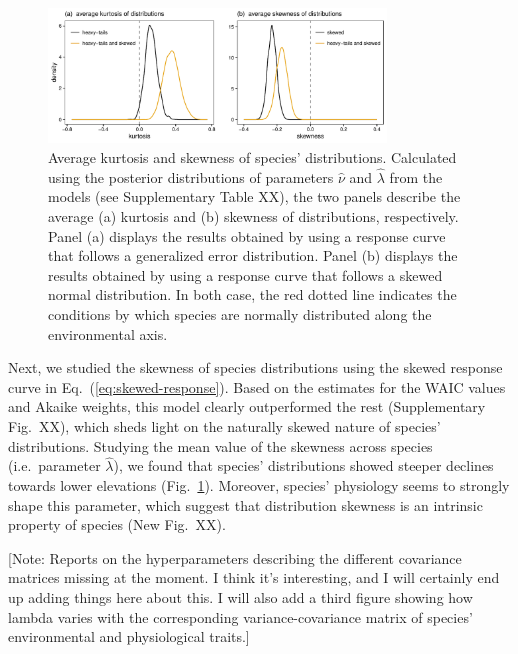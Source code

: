 \documentclass[11pt, a4paper]{article}
\begin{document}
\begin{figure}[ht]
  \centering
    \vspace{0.5cm}
    \includegraphics[width=0.8\textwidth]{figures/kurto-skew}
    	  \vspace{0.3cm}
	   \caption{Average kurtosis and skewness of species' distributions. Calculated using the posterior distributions of parameters $\hat{\nu}$ and $\hat{\lambda}$ from the models (see Supplementary Table XX), the two panels describe the average (a) kurtosis and (b) skewness of distributions, respectively. Panel (a) displays the results obtained by using a response curve that follows a generalized error distribution. Panel (b) displays the results obtained by using a response curve that follows a skewed normal distribution. In both case, the red dotted line indicates the conditions by which species are normally distributed along the environmental axis.}
      \label{fig:kurtosis-skewness}
\end{figure}

Next, we studied the skewness of species distributions using the skewed response curve in Eq.~(\ref{eq:skewed-response}). Based on the estimates for the WAIC values and Akaike weights, this model clearly outperformed the rest (Supplementary Fig.~XX), which sheds light on the naturally skewed nature of species' distributions. Studying the mean value of the skewness across species (i.e.~parameter $\hat{\lambda}$), we found that species' distributions showed steeper declines towards lower elevations (Fig.~\ref{fig:kurtosis-skewness}). Moreover, species' physiology seems to strongly shape this parameter, which suggest that distribution skewness is an intrinsic property of species (New Fig.~XX).
 
{\color{gray}
[Note: Reports on the hyperparameters describing the different covariance matrices missing at the moment. I think it's interesting, and I will certainly end up adding things here about this. I will also add a third figure showing how lambda varies with the corresponding variance-covariance matrix of species' environmental and physiological traits.]}
\end{document}
